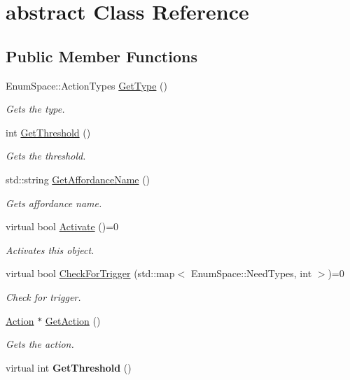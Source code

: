 \hypertarget{classabstract}{\section{abstract Class Reference}
\label{classabstract}
}
\subsection*{Public Member Functions}
\begin{DoxyCompactItemize}
\item 
Enum\-Space\-::\-Action\-Types \hyperlink{classabstract_a6a684ea689b2d2272e085b562d25e1df}{Get\-Type} ()
\begin{DoxyCompactList}\small\item\em Gets the type. \end{DoxyCompactList}\item 
int \hyperlink{classabstract_ab00d7ccece91f404e85db51c3aaa6689}{Get\-Threshold} ()
\begin{DoxyCompactList}\small\item\em Gets the threshold. \end{DoxyCompactList}\item 
std\-::string \hyperlink{classabstract_a642d5536052d134e26111f42cbdc48f1}{Get\-Affordance\-Name} ()
\begin{DoxyCompactList}\small\item\em Gets affordance name. \end{DoxyCompactList}\item 
virtual bool \hyperlink{classabstract_a552be28f2a8f0577d8af51aab7628dfe}{Activate} ()=0
\begin{DoxyCompactList}\small\item\em Activates this object. \end{DoxyCompactList}\item 
virtual bool \hyperlink{classabstract_ac3298d240dbc6a3f630e6bbb06b6ee72}{Check\-For\-Trigger} (std\-::map$<$ Enum\-Space\-::\-Need\-Types, int $>$)=0
\begin{DoxyCompactList}\small\item\em Check for trigger. \end{DoxyCompactList}\item 
\hyperlink{class_action}{Action} $\ast$ \hyperlink{classabstract_aaa22e7e0b383d8d936df67bc2ddfbbee}{Get\-Action} ()
\begin{DoxyCompactList}\small\item\em Gets the action. \end{DoxyCompactList}\item 
\hypertarget{classabstract_a5a925b041865eb58d7e83db71279796f}{virtual int {\bfseries Get\-Threshold} ()}\label{classabstract_a5a925b041865eb58d7e83db71279796f}


\end{DoxyCompactItemize}
